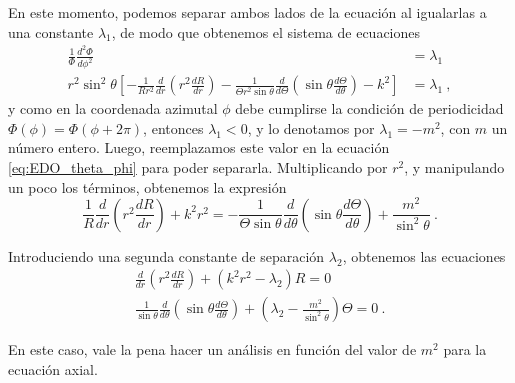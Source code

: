 En este momento, podemos separar ambos lados de la ecuación al igualarlas a una constante $\lambda_1$, de modo que obtenemos el sistema de ecuaciones
\begin{align}
    \frac{1}{\Phi} \frac{d^2\Phi}{d\phi^2} & = \lambda_1 \\
    r^2\sin^2\theta \left[ -\frac{1}{Rr^2} \frac{d}{dr}\left( r^2 \frac{dR}{dr} \right) - \frac{1}{\Theta r^2\sin\theta} \frac{d}{d\Theta} \left( \sin\theta \frac{d\Theta}{d\theta} \right) - k^2 \right] & = \lambda_1 \ , \label{eq:EDO_theta_phi}
\end{align}
y como en la coordenada azimutal $\phi$ debe cumplirse la condición de periodicidad $\Phi(\phi) = \Phi(\phi + 2\pi)$, entonces $\lambda_1<0$, y lo denotamos por $\lambda_1 = -m^2$, con $m$ un número entero. Luego, reemplazamos este valor en la ecuación \eqref{eq:EDO_theta_phi} para poder separarla. Multiplicando por $r^2$, y manipulando un poco los términos, obtenemos la expresión
\begin{equation}
    \frac{1}{R} \frac{d}{dr}\left( r^2 \frac{dR}{dr} \right) + k^2r^2 = - \frac{1}{\Theta\sin\theta} \frac{d}{d\theta}\left( \sin\theta \frac{d\Theta}{d\theta}\right) + \frac{m^2}{\sin^2\theta} \ .
\end{equation}

Introduciendo una segunda constante de separación $\lambda_2$, obtenemos las ecuaciones
\begin{align}
    \frac{d}{dr}\left( r^2 \frac{dR}{dr} \right) + (k^2r^2 - \lambda_2) R = 0 \\
    \frac{1}{\sin\theta} \frac{d}{d\theta}\left( \sin\theta \frac{d\Theta}{d\theta} \right) + \left( \lambda_2 - \frac{m^2}{\sin^2\theta} \right)\Theta = 0 \ .
\end{align}

En este caso, vale la pena hacer un análisis en función del valor de $m^2$ para la ecuación axial.

